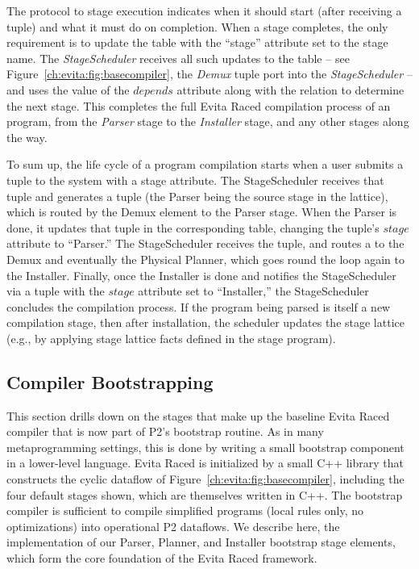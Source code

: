 The protocol to stage execution indicates when it should start (after receiving
a  tuple) and what it must do on completion.  When a
stage completes, the only requirement is to update the  table with
the ``stage'' attribute set to the stage name.  The {\em StageScheduler}
receives all such updates to the  table -- see
Figure~\ref{ch:evita:fig:basecompiler}, the {\em Demux}  tuple port
into the {\em StageScheduler} -- and uses the value of the 
$depends$ attribute along with the  relation to determine the
next stage.  This completes the full Evita Raced compilation process of an
\OVERLOG program, from the {\em Parser} stage to the {\em Installer} stage, and
any other stages along the way.

To sum up, the life cycle of a program compilation starts when a user submits a
 tuple to the system with a  stage attribute.  The
StageScheduler receives that  tuple and generates a
 tuple (the Parser being the source stage in the
lattice), which is routed by the Demux element to the Parser stage.  When the
Parser is done, it updates that  tuple in the corresponding table,
changing the tuple's $stage$ attribute to ``Parser.'' The StageScheduler
receives the  tuple, and routes a  to the
Demux and eventually the Physical Planner, which goes round the loop again to
the Installer.  Finally, once the Installer is done and notifies the
StageScheduler via a  tuple with the $stage$ attribute set to
``Installer,'' the StageScheduler concludes the compilation process.  If the
\OVERLOG program being parsed is itself a new compilation stage, then after
installation, the scheduler updates the stage lattice (e.g., by applying 
stage lattice facts defined in the stage program).


\subsection{Compiler Bootstrapping}
\label{ch:evita:sec:bootstrap}

This section drills down on the stages that make up the baseline Evita Raced
compiler that is now part of P2's bootstrap routine.  As in many
metaprogramming settings, this is done by writing a small bootstrap component
in a lower-level language.  Evita Raced is initialized by a small C++ library
that constructs the cyclic dataflow of Figure~\ref{ch:evita:fig:basecompiler},
including the four default stages shown, which are themselves written in C++.
The bootstrap compiler is sufficient to compile simplified \OVERLOG programs
(local rules only, no optimizations) into operational P2 dataflows.  We
describe here, the implementation of our Parser, Planner, and Installer
bootstrap stage elements, which form the core foundation of the Evita Raced
framework.

